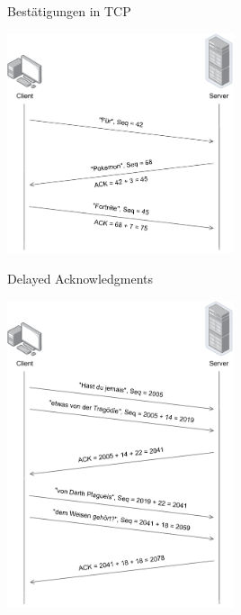 \begin{example}{Bestätigungen in TCP}
    \begin{center}
        \includegraphics[width=0.5\textwidth]{includes/figures/example_ack.pdf}
    \end{center}
\end{example}

\begin{example}{Delayed Acknowledgments}
    \begin{center}
        \includegraphics[width=0.5\textwidth]{includes/figures/example_delayed_ack.pdf}
    \end{center}
\end{example}

